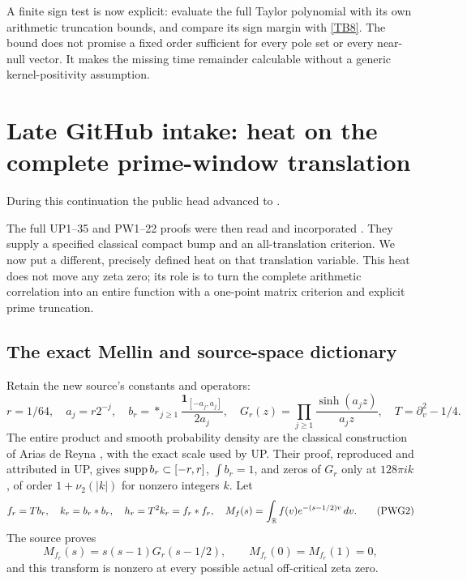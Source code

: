 \documentclass[11pt,a4paper]{article}
\theoremstyle{definition}\newtheorem{definition}[theorem]{Definition}
\begin{document}
A finite sign test is now explicit: evaluate the full Taylor polynomial with its own arithmetic truncation bounds, and compare its sign margin with \eqref{TB8}. The bound does not promise a fixed order sufficient for every pole set or every near-null vector. It makes the missing time remainder calculable without a generic kernel-positivity assumption.

\section{Late GitHub intake: heat on the complete prime-window translation}
During this continuation the public head advanced to
.\par
The full UP1--35 and PW1--22 proofs were then read and incorporated \cite{UP,PW}. They supply a specified classical compact bump and an all-translation criterion. We now put a different, precisely defined heat on that translation variable. This heat does not move any zeta zero; its role is to turn the complete arithmetic correlation into an entire function with a one-point matrix criterion and explicit prime truncation.

\subsection{The exact Mellin and source-space dictionary}
Retain the new source's constants and operators:
\begin{equation}
 r=1/64,\quad a_j=r2^{-j},\quad
 b_r=\mathop{*}_{j\ge1}\frac{\mathbf1_{[-a_j,a_j]}}{2a_j},\quad
 G_r(z)=\prod_{j\ge1}\frac{\sinh(a_jz)}{a_jz},\quad
 T=\partial_v^2-1/4.                                        \tag{PWG1}\label{PWG1}
\end{equation}
The entire product and smooth probability density are the classical construction of Arias de Reyna \cite{Arias}, with the exact scale used by UP. Their proof, reproduced and attributed in UP, gives
$\operatorname{supp} b_r\subset[-r,r]$, $\int b_r=1$, and zeros of $G_r$ only at
$128\pi i k$, of order $1+\nu_2(|k|)$ for nonzero integers $k$.
Let
\begin{equation}
 f_r=Tb_r,\quad k_r=b_r*b_r,\quad h_r=T^2k_r=f_r*f_r,
 \quad M_f(s)=\int_\mathbb R f(v)e^{-(s-1/2)v}\,dv.                 \tag{PWG2}\label{PWG2}
\end{equation}
The source proves
\begin{equation}
 M_{f_r}(s)=s(s-1)G_r(s-1/2),\qquad
 M_{f_r}(0)=M_{f_r}(1)=0,                                   \tag{PWG3}\label{PWG3}
\end{equation}
and this transform is nonzero at every possible actual off-critical zeta zero.
\end{document}
